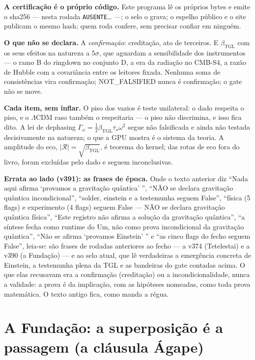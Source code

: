 \documentclass[11pt]{article}
\theoremstyle{definition}\newtheorem{deriv}{Derivação}
\begin{document}
\textbf{A certificação é o próprio código.} Este programa lê os próprios bytes e emite o sha256 --- nesta rodada \texttt{AUSENTE}… ---; o selo o grava; o espelho público e o site publicam o mesmo hash; quem roda confere, sem precisar confiar em ninguém.

\textbf{O que não se declara.} A \emph{confirmação}: creditação, ato de terceiros. E $\beta_{\mathrm{TGL}}$ com os seus efeitos na natureza a $5\sigma$, que aguardam a sensibilidade dos instrumentos --- o ramo B do ringdown no conjunto D, a era da radiação no CMB-S4, a razão de Hubble com a covariância entre os leitores fixada. Nenhuma soma de consistências vira confirmação; NOT\_FALSIFIED nunca é confirmação; o gate não se move.

\textbf{Cada item, sem inflar.} O piso dos vazios é teste unilateral: o dado respeita o piso, e o $\Lambda$CDM raso também o respeitaria --- o piso não discrimina, e isso fica dito. A lei de dephasing $\Gamma_\omega=\tfrac12\beta_{\mathrm{TGL}}\tau_\star\omega^2$ segue não falsificada e ainda não testada decisivamente na natureza; o que a GPU mostra é o sistema da teoria. A amplitude do eco, $|\mathcal R|=\sqrt{\beta_{\mathrm{TGL}}}$, é teorema do kernel; das  rotas de eco fora do livro,  foram excluídas pelo dado e  seguem inconclusivas.

\textbf{Errata ao lado (v391): as frases de época.} Onde o texto anterior diz ``Nada aqui afirma `provamos a gravitação quântica' '', ``NÃO se declara gravitação quântica incondicional'', ``solder, einstein e a testemunha seguem False'', ``física (5 flags) e experimento (4 flags) seguem False --- NÃO se declara gravitação quântica física'', ``Este registro não afirma a solução da gravitação quântica'', ``a síntese fecha como runtime do Um, não como prova incondicional da gravitação quântica'', ``Não se afirma `provamos Einstein' '' e ``as cinco flags do fecho seguem False'', leia-se: são frases de rodadas anteriores ao fecho --- a v374 (Tetelestai) e a v390 (a Fundação) --- e ao selo atual, que lê verdadeiras a emergência concreta de Einstein, a testemunha plena da TGL e as bandeiras do gate contadas acima. O que elas recusavam era a confirmação (creditação) ou a incondicionalidade, nunca a validade: a prova é da implicação, com as hipóteses nomeadas, como toda prova matemática. O texto antigo fica, como manda a régua.

\section*{A Fundação: a superposição é a passagem (a cláusula Ágape)}
\end{document}
